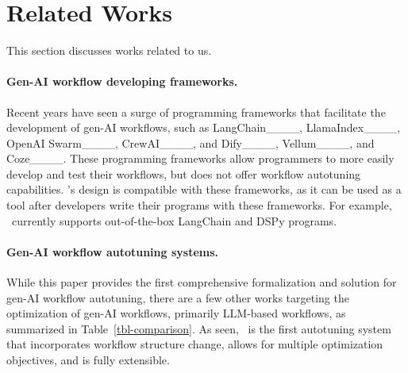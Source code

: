 \section{Related Works}
\label{sec:related}
This section discusses works related to us.



\paragraph{Gen-AI workflow developing frameworks.}
Recent years have seen a surge of programming frameworks that facilitate the development of gen-AI workflows, such as LangChain____, LlamaIndex____, OpenAI Swarm____, CrewAI____, and Dify____, Vellum____, and Coze____.
These programming frameworks allow programmers to more easily develop and test their workflows, but does not offer workflow autotuning capabilities.
\sysname's design is compatible with these frameworks, as it can be used as a tool after developers write their programs with these frameworks. For example, \sysname\ currently supports out-of-the-box LangChain and DSPy programs.

\paragraph{Gen-AI workflow autotuning systems.}
While this paper provides the first comprehensive formalization and solution for gen-AI workflow autotuning, there are a few other works targeting the optimization of gen-AI workflows, primarily LLM-based workflows, as summarized in Table~\ref{tbl-comparison}. As seen, \sysname\ is the first autotuning system that incorporates workflow structure change, allows for multiple optimization objectives, and is fully extensible.


